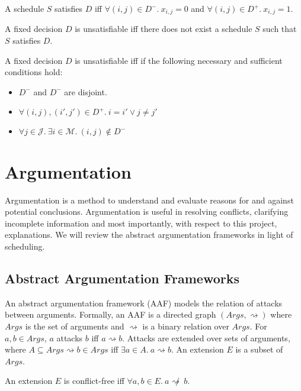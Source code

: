 \begin{definition}
	A schedule $S$ satisfies $D$ iff $\forall(i,j)\in D^-.\ x_{i,j}=0$ and $\forall (i,j)\in D^+.\ x_{i,j}=1$.
\end{definition}

\begin{definition}
	A fixed decision $D$ is unsatisfiable iff there does not exist a schedule $S$ such that $S$ satisfies $D$. 
\end{definition}

\begin{theorem}
	A fixed decision $D$ is unsatisfiable iff if the following necessary and sufficient conditions hold:
	\begin{itemize}
		\item$D^-$ and $D^-$ are disjoint.
		\item$\forall(i,j),(i',j')\in D^+.\ i=i'\lor j\neq j'$
		\item$\forall j\in\mathcal{J}.\ \exists i\in\mathcal{M}.\ (i,j)\not\in D^-$
	\end{itemize}
\end{theorem}

\section{Argumentation}

Argumentation is a method to understand and evaluate reasons for and against potential conclusions. Argumentation is useful in resolving conflicts, clarifying incomplete information and most importantly, with respect to this project, explanations. We will review the abstract argumentation frameworks in light of scheduling.

\subsection{Abstract Argumentation Frameworks}

An abstract argumentation framework (AAF) models the relation of attacks between arguments.\cite{aa} Formally, an AAF is a directed graph $(Args,\rightsquigarrow)$ where $Args$ is the set of arguments and $\rightsquigarrow$ is a binary relation over $Args$. For $a,b\in Args$, $a$ attacks $b$ iff $a\rightsquigarrow b$. Attacks are extended over sets of arguments, where $A\subseteq Args\rightsquigarrow b\in Args$ iff $\exists a\in A.\ a\rightsquigarrow b$. An extension $E$ is a subset of $Args$.

\begin{definition}
	An extension $E$ is conflict-free iff $\forall a,b\in E.\ a\not\rightsquigarrow\ b$.
\end{definition}

